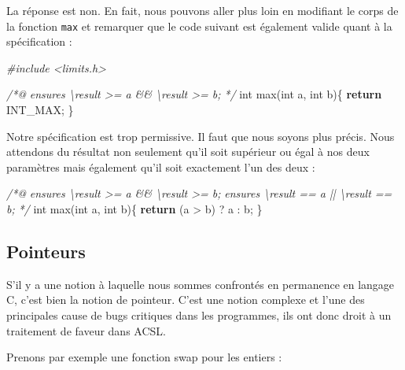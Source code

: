 \documentclass[12pt,francais,]{scrbook}
\newenvironment{Shaded}{}{}
\newcommand{\KeywordTok}[1]{\textcolor[rgb]{0.00,0.44,0.13}{\textbf{{#1}}}}
\newcommand{\DataTypeTok}[1]{\textcolor[rgb]{0.56,0.13,0.00}{{#1}}}
\newcommand{\CommentTok}[1]{\textcolor[rgb]{0.38,0.63,0.69}{\textit{{#1}}}}
\newcommand{\NormalTok}[1]{{#1}}
\begin{document}
La réponse est non. En fait, nous pouvons aller plus loin en modifiant
le corps de la fonction \texttt{max} et remarquer que le code suivant
est également valide quant à la spécification :

\begin{footnotesize}\begin{Shaded}
\begin{Highlighting}[]
\CommentTok{#include <limits.h>}

\CommentTok{/*@}
\CommentTok{  ensures \textbackslash{}result >= a && \textbackslash{}result >= b;}
\CommentTok{*/}
\DataTypeTok{int} \NormalTok{max(}\DataTypeTok{int} \NormalTok{a, }\DataTypeTok{int} \NormalTok{b)\{}
  \KeywordTok{return} \NormalTok{INT_MAX;}
\NormalTok{\}}
\end{Highlighting}
\end{Shaded}\end{footnotesize}

Notre spécification est trop permissive. Il faut que nous soyons plus
précis. Nous attendons du résultat non seulement qu'il soit supérieur ou
égal à nos deux paramètres mais également qu'il soit exactement l'un des
deux :

\begin{footnotesize}\begin{Shaded}
\begin{Highlighting}[]
\CommentTok{/*@}
\CommentTok{  ensures \textbackslash{}result >= a && \textbackslash{}result >= b;}
\CommentTok{  ensures \textbackslash{}result == a || \textbackslash{}result == b;}
\CommentTok{*/}
\DataTypeTok{int} \NormalTok{max(}\DataTypeTok{int} \NormalTok{a, }\DataTypeTok{int} \NormalTok{b)\{}
  \KeywordTok{return} \NormalTok{(a > b) ? a : b;}
\NormalTok{\}}
\end{Highlighting}
\end{Shaded}\end{footnotesize}

\subsection{Pointeurs}\label{pointeurs}

S'il y a une notion à laquelle nous sommes confrontés en permanence en
langage C, c'est bien la notion de pointeur. C'est une notion complexe
et l'une des principales cause de bugs critiques dans les programmes,
ils ont donc droit à un traitement de faveur dans ACSL.

Prenons par exemple une fonction swap pour les entiers :
\end{document}
